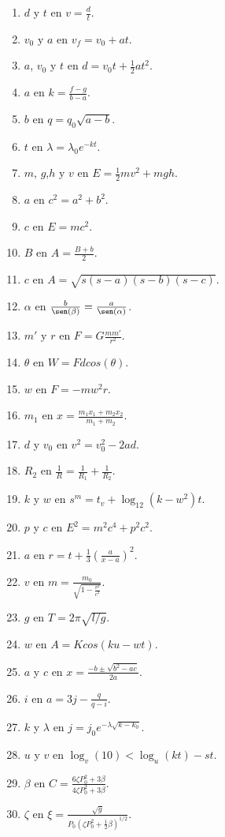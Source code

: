 \begin{enumerate}
 \item $d$ y $t$ en $v = \frac{d}{t}$.
 \item $v_0$ y $a$ en $v_f = v_0 + at$.
 \item $a$, $v_{0}$ y $t$ en $d = v_{0} t + \frac{1}{2} at^2$.
 \item $a$ en $k = \frac{f - g}{b - a}$.
 \item $b$ en $q = q_0 \sqrt{a-b}$.
 \item $t$ en $\lambda = \lambda_0 e^{-kt}$.
 \item $m$, $g$,$h$ y $v$ en $E = \frac{1}{2}mv^2 + mgh$.
 \item $a$ en $c^2 = a^2 + b^2$.
 \item $c$ en $E = mc^2$.
 \item $B$ en $A = \frac{B + b}{2}$.
 \item $c$ en $A = \sqrt{s(s-a)(s-b)(s-c)}$.
 \item $\alpha$ en $\frac{b}{\sen(\beta)}=\frac{a}{\sen(\alpha)}$.
 \item $m'$ y $r$ en $F = G\frac{mm'}{r^2}$.
 \item $\theta$ en $W = Fd cos(\theta)$.
 \item $w$ en $F = -mw^2r$.
 \item $m_1$ en $x = \frac{m_1x_1+m_2x_2}{m_1+m_2}$.
 \item $d$ y $v_0$ en $v^2 = v_0^2 -2ad$.
 \item $R_2$ en $\frac{1}{R} = \frac{1}{R_1} + \frac{1}{R_2}$.
 \item $k$ y $w$ en $s^m = t_v + \log_{12}(k-w^2)t$.
 \item $p$ y $c$ en $E^2 = m^2 c^4 + p^2c^2$.
 \item $a$ en $r = t +\frac{1}{3}(\frac{a}{x-a})^2$.
 \item $v$ en $m = \frac{m_0}{\sqrt{1-\frac{v^2}{c^2}}}$.
 \item $g$ en $T = 2\pi\sqrt{l/g}$.
 \item $w$ en $A = K cos(ku - wt)$.
 \item $a$ y $c$ en $x = \frac{-b \pm \sqrt{b^2-ac}}{2a}$.
 \item $i$ en $a = 3j - \frac{q}{q-i}$.
 \item $k$ y $\lambda$ en $j = j_0 e^{-\lambda\sqrt{k-k_0}}$.
 \item $u$ y $v$ en $\log_{v}(10) < \log_{u}(kt) - st$.
 \item $\beta$ en $C =  \frac{6\zeta P_0^2 + 3\beta}{4\zeta P_0^2 + 3\beta}$.
 \item $\zeta$ en $\xi = \frac{\sqrt{g}}{P_0\left( \zeta P_0^2+\frac{1}{2}\beta\right)^{1/2}}$.
 \end{enumerate}




